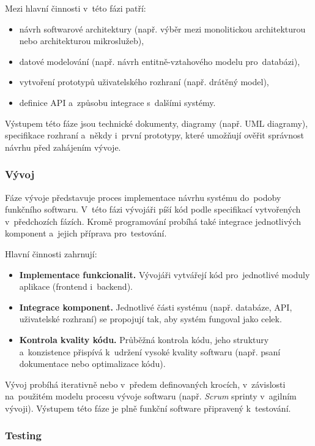 \documentclass[male,czech,api_bc]{kitheses}
\begin{document}
Mezi hlavní činnosti v~této fázi patří:
\begin{itemize}
	\item návrh softwarové architektury (např. výběr mezi monolitickou architekturou nebo architekturou mikroslužeb),
	\item datové modelování (např. návrh entitně-vztahového modelu pro~databázi),
	\item vytvoření prototypů uživatelského rozhraní (např. drátěný model),
	\item definice API a~způsobu integrace s~dalšími systémy.
\end{itemize}

Výstupem této fáze jsou technické dokumenty, diagramy (např. UML diagramy), specifikace rozhraní a~někdy i~první prototypy, které umožňují ověřit správnost návrhu před zahájením vývoje.

\subsubsection{Vývoj}

Fáze vývoje představuje proces implementace návrhu systému do~podoby funkčního softwaru. V~této fázi vývojáři píší kód podle specifikací vytvořených v~předchozích fázích. Kromě programování probíhá také integrace jednotlivých komponent a~jejich příprava pro~testování.

Hlavní činnosti zahrnují:
\begin{itemize}
	\item \textbf{Implementace funkcionalit.} Vývojáři vytvářejí kód pro~jednotlivé moduly aplikace (frontend i~backend).
	\item \textbf{Integrace komponent.} Jednotlivé části systému (např. databáze, API, uživatelské rozhraní) se propojují tak, aby systém fungoval jako celek.
	\item \textbf{Kontrola kvality kódu.} Průběžná kontrola kódu, jeho struktury a~konzistence přispívá k~udržení vysoké kvality softwaru (např. psaní dokumentace nebo optimalizace kódu).
\end{itemize}

Vývoj probíhá iterativně nebo v~předem definovaných krocích, v~závislosti na~použitém modelu procesu vývoje softwaru (např. \textit{Scrum} sprinty v~agilním vývoji). Výstupem této fáze je plně funkční software připravený k~testování.

\subsubsection{Testing}
\end{document}

